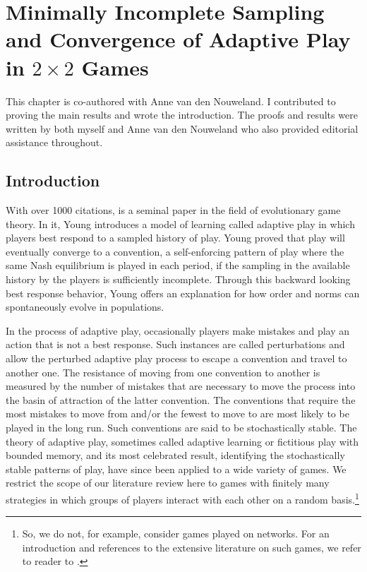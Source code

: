 \chapter{Minimally Incomplete Sampling and Convergence of Adaptive Play in $2\times 2$ Games}

This chapter is co-authored with Anne van den Nouweland. I contributed to proving the main results and wrote the introduction. The proofs and results were written by both myself and Anne van den Nouweland who also provided editorial assistance throughout.

\section{Introduction}
With over 1000 citations, \cite{young1993evolution} is a seminal paper in the field of evolutionary game theory. In it, Young introduces a model of learning called adaptive play in which players best respond to a sampled history of play. Young proved that play will eventually converge to a convention, a self-enforcing pattern of play where the same Nash equilibrium is played in each period, if the sampling in the available history by the players is sufficiently incomplete. Through this backward looking best response behavior, Young offers an explanation for how order and norms can spontaneously evolve in populations.

In the process of adaptive play, occasionally players make mistakes and play an action that is not a best response. Such instances are called perturbations and allow the perturbed adaptive play process to escape a convention and travel to another one. The resistance of moving from one convention to another is measured by the number of mistakes that are necessary to move the process into the basin of attraction of the latter convention. The conventions that require the most mistakes to move from and/or the fewest to move to are most likely to be played in the long run. Such conventions are said to be stochastically stable. The theory of adaptive play, sometimes called adaptive learning or fictitious play with bounded memory, and its most celebrated result, identifying the 
stochastically stable patterns of play, have since been applied to a wide variety of games. We restrict the scope of our literature review here to games with finitely many strategies 
in which groups of players interact with each other on a random basis.\footnote{So, we do not, for example, consider games played on networks. For an introduction and references to the extensive  literature on such games, we refer to reader to \cite{WALLACE2015327}.
}

